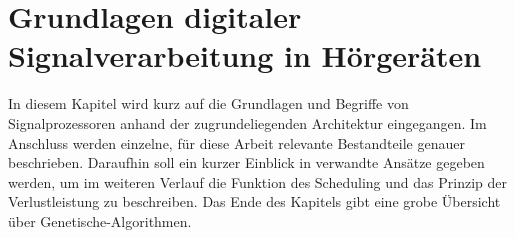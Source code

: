 \chapter{Grundlagen digitaler Signalverarbeitung in Hörgeräten}
\label{chap:grundlagen}
In diesem Kapitel wird kurz auf die Grundlagen und Begriffe von Signalprozessoren anhand der zugrundeliegenden Architektur eingegangen. Im Anschluss werden einzelne, für diese Arbeit relevante Bestandteile genauer beschrieben. Daraufhin soll ein kurzer Einblick in verwandte Ansätze gegeben werden, um im weiteren Verlauf die Funktion des Scheduling und das Prinzip der Verlustleistung zu beschreiben. Das Ende des Kapitels gibt eine grobe Übersicht über Genetische-Algorithmen.




